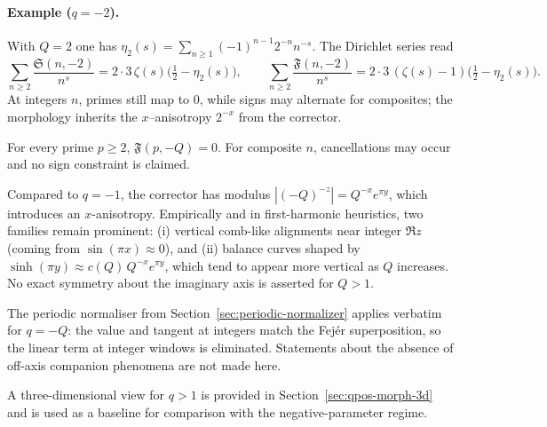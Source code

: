 \paragraph{Example ($q=-2$).}
With \(Q=2\) one has \(\eta_{2}(s)=\sum_{n\ge1}(-1)^{n-1}2^{-n}n^{-s}\). The Dirichlet series read
\[
\sum_{n\ge2}\frac{\mathfrak S(n,-2)}{n^{s}}=2\cdot3\,\zeta(s)\Big(\tfrac12-\eta_{2}(s)\Big),\qquad
\sum_{n\ge2}\frac{\mathfrak F(n,-2)}{n^{s}}=2\cdot3\,(\zeta(s)-1)\Big(\tfrac12-\eta_{2}(s)\Big).
\]
At integers \(n\), primes still map to \(0\), while signs may alternate for composites; the morphology inherits the $x$–anisotropy \(2^{-x}\) from the corrector.

\begin{lemma}\label{lem:qlessminus1-prime}
For every prime $p\ge2$, $\mathfrak F(p,-Q)=0$. For composite $n$, cancellations may occur and no sign constraint is claimed.
\end{lemma}

\begin{remark}
Compared to $q=-1$, the corrector has modulus $|(-Q)^{-z}|=Q^{-x}e^{\pi y}$, which introduces an $x$-anisotropy. Empirically and in first-harmonic heuristics, two families remain prominent: (i) vertical comb-like alignments near integer $\Re z$ (coming from $\sin(\pi x)\approx0$), and (ii) balance curves shaped by $\sinh(\pi y)\approx c(Q)\,Q^{-x}e^{\pi y}$, which tend to appear more vertical as $Q$ increases. No exact symmetry about the imaginary axis is asserted for $Q>1$.
\end{remark}

\begin{remark}
The periodic normaliser from Section~\ref{sec:periodic-normalizer} applies verbatim for $q=-Q$: the value and tangent at integers match the Fej\'er superposition, so the linear term at integer windows is eliminated. Statements about the absence of off-axis companion phenomena are not made here.
\end{remark}

A three-dimensional view for $q>1$ is provided in Section~\ref{sec:qpos-morph-3d} and is used as a baseline for comparison with the negative-parameter regime.


